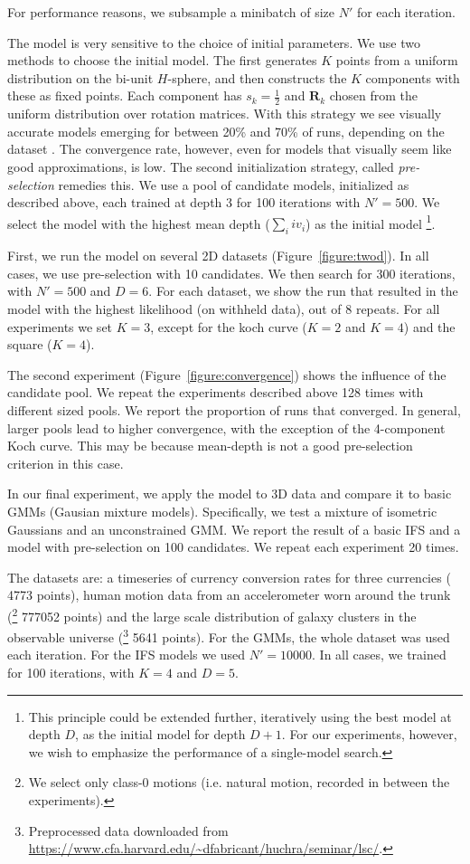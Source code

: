\documentclass[reprint,amsmath,amssymb,aps,prl]{revtex4-1}
\newcommand{\bR}{\boldsymbol R}
\begin{document}
For performance reasons, we subsample a minibatch of size $N'$ for each iteration.

The model is very sensitive to the choice of initial parameters. We use two methods to choose the initial model. The first generates $K$ points from a uniform distribution on the bi-unit $H$-sphere, and then constructs the $K$ components with these as fixed points. Each component has $s_k = \frac{1}{2}$ and $\bR_k$ chosen from the uniform distribution over rotation matrices. With this strategy we see visually accurate models emerging for between 20\% and 70\% of runs, depending on the dataset \cite{bloem2016single}. The convergence rate, however, even for models that visually seem like good approximations, is low. The second initialization strategy, called \emph{pre-selection} remedies this. We use a pool of candidate models, initialized as described above, each trained at depth 3 for 100 iterations with $N' = 500$. We select the model with the highest mean depth ($\sum_i iv_i$) as the initial model \footnote{This principle could be extended further, iteratively using the best model at depth $D$, as the initial model for depth $D+1$. For our experiments, however, we wish to emphasize the performance of a single-model search.}.

First, we run the model on several 2D datasets (Figure~\ref{figure:twod}). In all cases, we use pre-selection with 10 candidates. We then search for 300 iterations, with $N' = 500$ and $D=6$. For each dataset, we show the run that resulted in the model with the highest likelihood (on withheld data), out of 8 repeats. For all experiments we set $K=3$, except for the koch curve ($K=2$ and $K=4$) and the square ($K=4$).

The second experiment (Figure~\ref{figure:convergence}) shows the influence of the candidate pool. We repeat the experiments described above 128 times with different sized pools. We report the proportion of runs that converged. In general, larger pools lead to higher convergence, with the exception of the 4-component Koch curve. This may be because mean-depth is not a good pre-selection criterion in this case.

In our final experiment, we apply the model to 3D data and compare it to basic GMMs (Gausian mixture models). Specifically, we test a mixture of isometric Gaussians and an unconstrained GMM. We report the result of a basic IFS and a model with pre-selection on 100 candidates. We repeat each experiment 20 times.

The datasets are: a timeseries of currency conversion rates for three currencies (\cite{franses2000non,hyndman2010time} 4773 points), human motion data from an accelerometer worn around the trunk  (\cite{bachlin2010wearable}\footnote{We select only class-0 motions (i.e. natural motion, recorded in between the experiments).} 777052 points) and the large scale distribution of galaxy clusters in the observable universe (\cite{skrutskie2006two}\footnote{Preprocessed data downloaded from \url{https://www.cfa.harvard.edu/~dfabricant/huchra/seminar/lsc/}.} 5641 points). For the GMMs, the whole dataset was used each iteration. For the IFS models we used $N' = 10000$. In all cases, we trained for 100 iterations, with $K=4$ and $D=5$.
\end{document}
